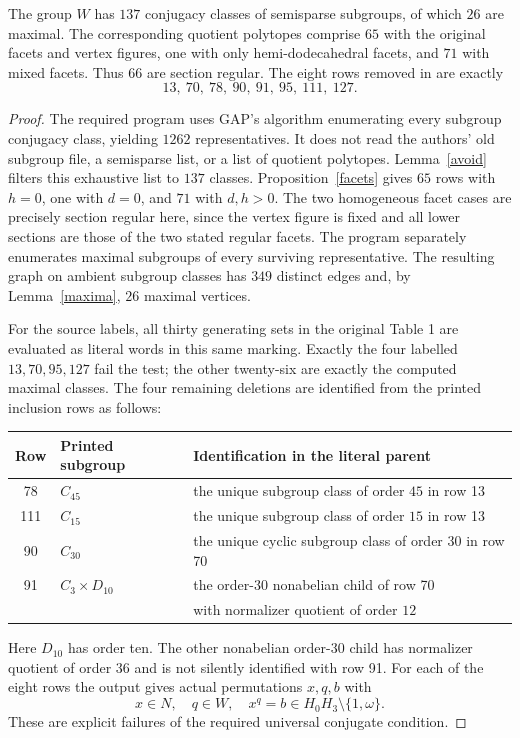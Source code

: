 \begin{theorem}\label{census}
The group $W$ has $137$ conjugacy classes of semisparse subgroups, of which $26$ are maximal. The corresponding quotient polytopes comprise $65$ with the original facets and vertex figures, one with only hemi-dodecahedral facets, and $71$ with mixed facets. Thus $66$ are section regular. The eight rows removed in \cite{erratum} are exactly
\[
 13,\ 70,\ 78,\ 90,\ 91,\ 95,\ 111,\ 127.
\]
\end{theorem}
\begin{proof}
The required program uses GAP's algorithm enumerating every subgroup conjugacy class, yielding $1262$ representatives. It does not read the authors' old subgroup file, a semisparse list, or a list of quotient polytopes. Lemma~\ref{avoid} filters this exhaustive list to $137$ classes. Proposition~\ref{facets} gives $65$ rows with $h=0$, one with $d=0$, and $71$ with $d,h>0$. The two homogeneous facet cases are precisely section regular here, since the vertex figure is fixed and all lower sections are those of the two stated regular facets. The program separately enumerates maximal subgroups of every surviving representative. The resulting graph on ambient subgroup classes has $349$ distinct edges and, by Lemma~\ref{maxima}, $26$ maximal vertices.

For the source labels, all thirty generating sets in the original Table 1 are evaluated as literal words in this same marking. Exactly the four labelled $13,70,95,127$ fail the test; the other twenty-six are exactly the computed maximal classes. The four remaining deletions are identified from the printed inclusion rows as follows:
\begin{center}\begin{tabular}{cll}\toprule
Row&Printed subgroup&Identification in the literal parent\\\midrule
78&$C_{45}$&the unique subgroup class of order $45$ in row 13\\
111&$C_{15}$&the unique subgroup class of order $15$ in row 13\\
90&$C_{30}$&the unique cyclic subgroup class of order $30$ in row 70\\
91&$C_3\times D_{10}$&the order-$30$ nonabelian child of row 70\\
&&with normalizer quotient of order $12$\\\bottomrule\end{tabular}\end{center}
Here $D_{10}$ has order ten. The other nonabelian order-$30$ child has normalizer quotient of order $36$ and is not silently identified with row 91. For each of the eight rows the output gives actual permutations $x,q,b$ with
\[
 x\in N,\quad q\in W,\quad x^q=b\in H_0H_3\setminus\{1,\omega\}.
\]
These are explicit failures of the required universal conjugate condition.


\end{proof}
